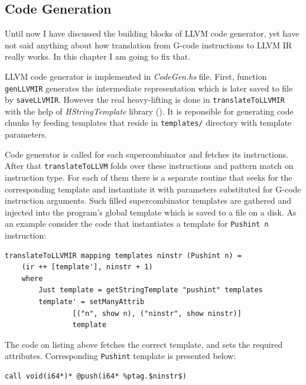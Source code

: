 \documentclass[12pt,a4paper]{report}
\begin{document}
\subsection{Code Generation}
Until now I have discussed the building blocks of LLVM code generator, yet
have not said anything about how translation from G-code instructions to LLVM IR
really works. In this chapter I am going to fix that.

LLVM code generator is implemented in \textit{CodeGen.hs} file. First, function
\texttt{genLLVMIR} generates the intermediate representation which is later
saved to file by \texttt{saveLLVMIR}. However the real heavy-lifting is done in
\texttt{translateToLLVMIR} with the help of \textit{HStringTemplate} library
(\cite{website:hstring_template}). It is reponsible for generating code chunks
by feeding templates that reside in \texttt{templates/} directory with template
parameters.

Code generator is called for each supercombinator and fetches its instructions.
After that \texttt{translateToLLVM} folds over these instructions and pattern
match on instruction type. For each of them there is a separate routine that
seeks for the corresponding template and instantiate it with parameters
substituted for G-code instruction arguments. Such filled supercombinator
templates are gathered and injected into the program's global template which is
saved to a file on a disk. As an example consider the code that instantiates a
template for \texttt{Pushint n} instruction:

\vspace*{0.2in}
\begin{lstlisting}[style=haskell]
translateToLLVMIR mapping templates ninstr (Pushint n) =
    (ir ++ [template'], ninstr + 1)
    where
        Just template = getStringTemplate "pushint" templates
        template' = setManyAttrib
                [("n", show n), ("ninstr", show ninstr)]
                template
\end{lstlisting}

The code on listing above fetches the correct template, and sets the required
attributes. Corresponding \texttt{Pushint} template is presented below:

\vspace*{0.2in}
\begin{lstlisting}[style=assembler]
%ptag.$ninstr$ = call i64*(i64)* @hAllocNum(i64 $n$)
call void(i64*)* @push(i64* %ptag.$ninstr$)
\end{lstlisting}
\end{document}
